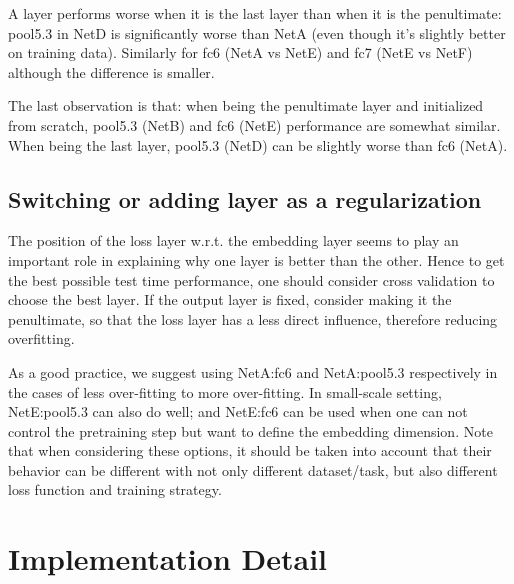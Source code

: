 \documentclass[10pt,twocolumn,letterpaper]{article}
\begin{document}
A layer performs worse when it is the last layer than when it is the penultimate: pool5.3 in NetD is significantly worse than NetA (even though it's slightly better on training data). Similarly for fc6 (NetA vs NetE) and fc7 (NetE vs NetF) although the difference is smaller.

The last observation is that: when being the penultimate layer and initialized from scratch, pool5.3 (NetB) and fc6 (NetE) performance are somewhat similar. When being the last layer, pool5.3 (NetD) can be slightly worse than fc6 (NetA).


\subsection{Switching or adding layer as a regularization}


The position of the loss layer w.r.t. the embedding layer seems to play an important role in explaining why one layer is better than the other. Hence to get the best possible test time performance, one should consider cross validation to choose the best layer. If the output layer is fixed, consider making it the penultimate, so that the loss layer has a less direct influence, therefore reducing overfitting.

As a good practice, we suggest using NetA:fc6 and NetA:pool5.3 respectively in the cases of less over-fitting to more over-fitting. In small-scale setting, NetE:pool5.3 can also do well; and NetE:fc6 can be used when one can not control the pretraining step but want to define the embedding dimension. Note that when considering these options, it should be taken into account that their behavior can be different with not only different dataset/task, but also different loss function and training strategy.



\section{Implementation Detail}
\end{document}
